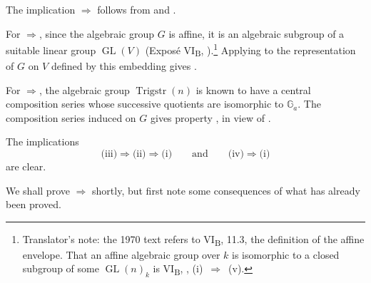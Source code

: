 The implication \(\Rightarrow\) follows from  and .

For \(\Rightarrow\), since the algebraic group \(G\) is
affine, it is an algebraic subgroup of a suitable linear group
\(\operatorname{GL}(V)\) (Exposé VI\textsubscript{B}, ).\footnote{Translator's note: the
1970 text refers to VI\textsubscript{B}, 11.3, the definition of the affine envelope. That an affine
algebraic group over \(k\) is isomorphic to a closed subgroup of some \(\operatorname{GL}(n)_k\) is
VI\textsubscript{B}, , (i)~\(\Rightarrow\)~(v).}
Applying  to the representation of \(G\) on \(V\) defined by this
embedding gives .

For \(\Rightarrow\), the algebraic group
\(\operatorname{Trigstr}(n)\) is known to have a central composition
series whose successive quotients are isomorphic to \(\mathbb G_a\).
The composition series induced on \(G\) gives property , in view
of .

The implications
\[
  \text{(iii)}\Rightarrow\text{(ii)}\Rightarrow\text{(i)}
  \qquad\text{and}\qquad
  \text{(iv)}\Rightarrow\text{(i)}
\]
are clear.

We shall prove \(\Rightarrow\) shortly, but first note some
consequences of what has already been proved.

